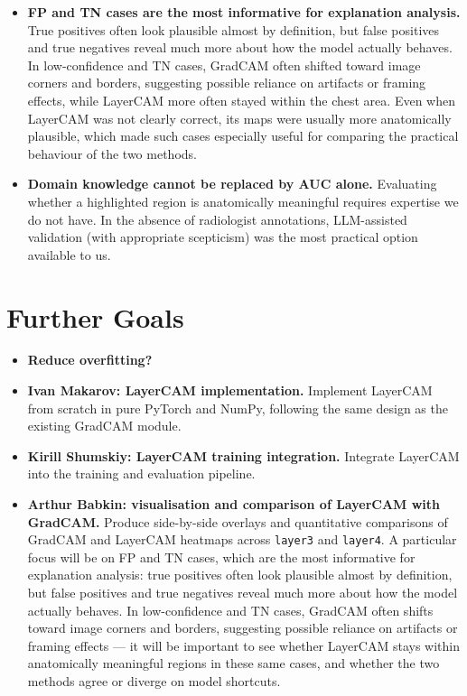 \documentclass[12pt]{article}
\begin{document}
\begin{itemize}
    \item \textbf{FP and TN cases are the most informative for explanation analysis.}
    True positives often look plausible almost by definition, but false positives and true negatives reveal much more about how the model actually behaves. In low-confidence and TN cases, GradCAM often shifted toward image corners and borders, suggesting possible reliance on artifacts or framing effects, while LayerCAM more often stayed within the chest area. Even when LayerCAM was not clearly correct, its maps were usually more anatomically plausible, which made such cases especially useful for comparing the practical behaviour of the two methods.

    \item \textbf{Domain knowledge cannot be replaced by AUC alone.}
    Evaluating whether a highlighted region is anatomically meaningful requires expertise we do not have.
    In the absence of radiologist annotations, LLM-assisted validation (with appropriate scepticism) was the most practical option available to us.
\end{itemize}

\section{Further Goals}

\begin{itemize}
    \item \textbf{Reduce overfitting?}

    \item \textbf{Ivan Makarov: LayerCAM implementation.}
    Implement LayerCAM from scratch in pure PyTorch and NumPy, following the same design as the existing GradCAM module.

    \item \textbf{Kirill Shumskiy: LayerCAM training integration.}
    Integrate LayerCAM into the training and evaluation pipeline.

    \item \textbf{Arthur Babkin: visualisation and comparison of LayerCAM with GradCAM.}
    Produce side-by-side overlays and quantitative comparisons of GradCAM and LayerCAM heatmaps across \texttt{layer3} and \texttt{layer4}.
    A particular focus will be on FP and TN cases, which are the most informative for explanation analysis: true positives often look plausible almost by definition, but false positives and true negatives reveal much more about how the model actually behaves.
    In low-confidence and TN cases, GradCAM often shifts toward image corners and borders, suggesting possible reliance on artifacts or framing effects --- it will be important to see whether LayerCAM stays within anatomically meaningful regions in these same cases, and whether the two methods agree or diverge on model shortcuts.
\end{itemize}
\end{document}
